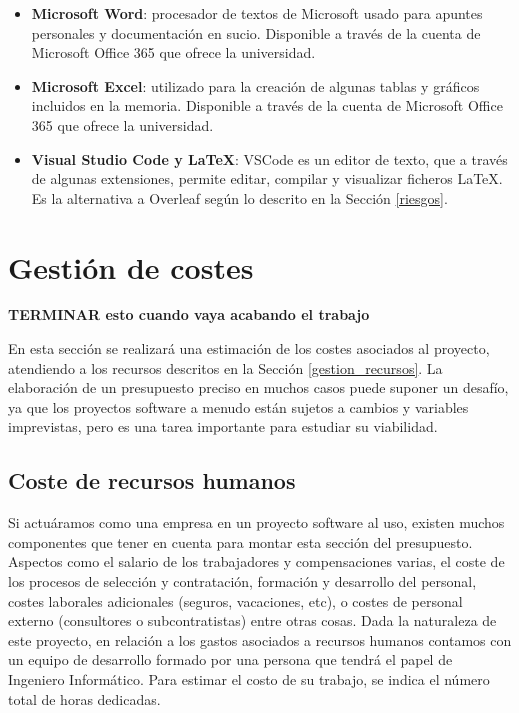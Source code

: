 \begin{itemize}
    \item \textbf{Microsoft Word}: procesador de textos de Microsoft usado para apuntes personales y documentación en sucio. Disponible a través de la cuenta de Microsoft Office 365 que ofrece la universidad.

    \item \textbf{Microsoft Excel}: utilizado para la creación de algunas tablas y gráficos incluidos en la memoria. Disponible a través de la cuenta de Microsoft Office 365 que ofrece la universidad.

    \item \textbf{Visual Studio Code y LaTeX}: VSCode es un editor de texto, que a través de algunas extensiones, permite editar, compilar y visualizar ficheros LaTeX. Es la alternativa a Overleaf según lo descrito en la Sección \ref{riesgos}. 

    
    
\end{itemize}

\section{Gestión de costes}
\textbf{TERMINAR esto cuando vaya acabando el trabajo}

En esta sección se realizará una estimación de los costes asociados al proyecto, atendiendo a los recursos descritos en la Sección \ref{gestion_recursos}. La elaboración de un presupuesto preciso en muchos casos puede suponer un desafío, ya que los proyectos software a menudo están sujetos a cambios y variables imprevistas, pero es una tarea importante para estudiar su viabilidad. 

\subsection{Coste de recursos humanos}
Si actuáramos como una empresa en un proyecto software al uso, existen muchos componentes que tener en cuenta para montar esta sección del presupuesto. Aspectos como el salario de los trabajadores y compensaciones varias, el coste de los procesos de selección y contratación, formación y desarrollo del personal, costes laborales adicionales (seguros, vacaciones, etc), o costes de personal externo (consultores o subcontratistas) entre otras cosas.
Dada la naturaleza de este proyecto, en relación a los gastos asociados a recursos humanos contamos con un equipo de desarrollo formado por una persona que tendrá el papel de Ingeniero Informático. Para estimar el costo de su trabajo, se indica el número total de horas dedicadas.

